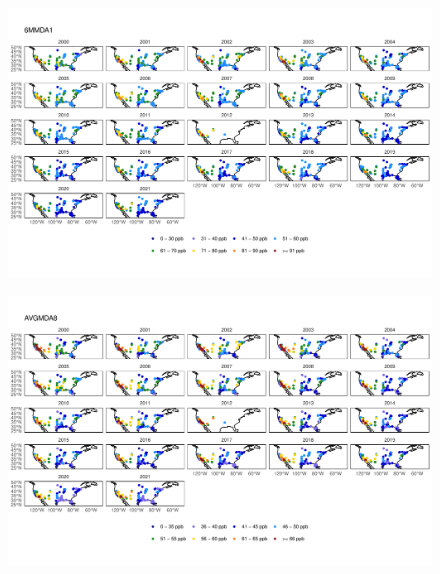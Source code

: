 \documentclass{article}
\begin{document}
\begin{figure}
\centering
\includegraphics[height=0.75\textheight]{figures/si_figures/fS20_metric_map_United-States-of-America_6MMDA1.pdf}
\caption{}
\label{si_fig:metric_map_us_6MMDA1}
\end{figure}
\clearpage

\begin{figure}
\centering
\includegraphics[height=0.75\textheight]{figures/si_figures/fS21_metric_map_United-States-of-America_AVGMDA8.pdf}
\caption{}
\label{si_fig:metric_map_us_AVGMDA8}
\end{figure}
\clearpage


\end{document}
